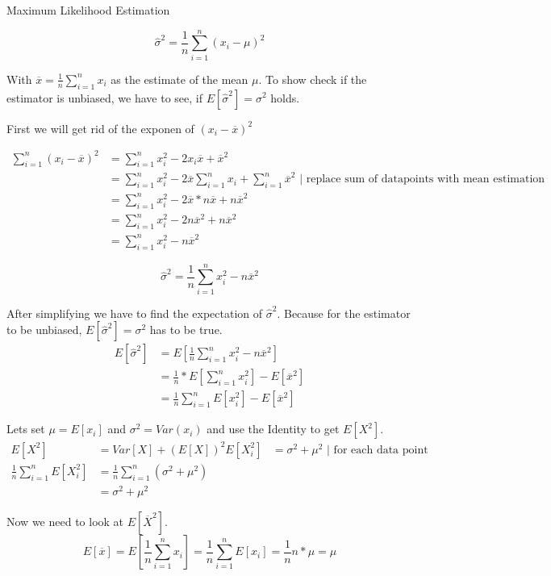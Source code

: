 \documentclass[
	english,
        solution=true
	]{tudaexercise}
\begin{document}
\begin{task}[points=20]{Maximum Likelihood Estimation}
\begin{solution}
\[\hat{\sigma}^2=\frac{1}{n} \sum^n_{i=1} (x_i-\mu)^2\]

With $\overline{x}=\frac{1}{n} \sum^n_{i=1} x_i$ as the estimate of the mean $\mu$. To show check if the estimator is unbiased, we have to see, if $E[\hat{\sigma}^2]=\sigma^2$ holds.

First we will get rid of the exponen of $(x_i-\overline{x})^2$

\begin{align*}
    \sum^n_{i=1}(x_i-\overline{x})^2 &=   \sum^n_{i=1} x_i^2-2x_i\overline{x}+\overline{x}^2 \\
    &= \sum^n_{i=1} x_i^2 - 2\overline{x} \sum_{i=1}^n x_i + \sum^n_{i=1} \overline{x}^2 \text{ | replace sum of datapoints with mean estimation}\\
    &= \sum^n_{i=1} x_i^2 - 2 \overline{x} * n\overline{x} + n\overline{x}^2 \\
    &= \sum^n_{i=1} x_i^2 - 2n\overline{x}^2 + n \overline{x}^2\\
    &= \sum^n_{i=1} x_i^2 - n\overline{x}^2
\end{align*}

\[\hat{\sigma}^2=\frac{1}{n} \sum^n_{i=1} x^2_i - n\overline{x}^2\]

After simplifying we have to find the expectation of $\hat{\sigma}^2$. Because for the estimator to be unbiased, $E[\hat{\sigma}^2]=\sigma^2$ has to be true.
\begin{align*}
    E[\hat{\sigma}^2] &= E[\frac{1}{n} \sum^n_{i=1} x^2_i-n \overline{x}^2] \\
    &= \frac{1}{n} *E[\sum^n_{i=1} x_i^2]-E[\overline{x}^2] \\
    &= \frac{1}{n} \sum^n_{i=1} E[x^2_i]-E[\overline{x}^2]
\end{align*}

Lets set $\mu=E[x_i]$ and $\sigma^2 = Var(x_i)$ and use the Identity to get $E[X^2]$.
\begin{align*}
    E[X^2]&=Var[X]+(E[X])^2
    E[X_i^2]&=\sigma^2 + \mu^2 \text{ | for each data point}\\
    \frac{1}{n} \sum^n_{i=1} E[X_i^2] &= \frac{1}{n} \sum^n_{i=1} (\sigma^2 + \mu^2) \\
    &=\sigma^2+\mu^2 
\end{align*}

Now we need to look at $E[\overline{X}^2]$. \\
\[E[\overline{x}]=E[\frac{1}{n} \sum^n_{i=1} x_i]=\frac{1}{n} \sum^n_{i=1} E[x_i]=\frac{1}{n} n*\mu=\mu\]


\end{solution}
\end{task}
\end{document}
